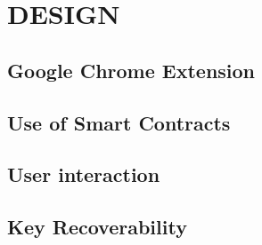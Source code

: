 \chapter{DESIGN}

\section{Google Chrome Extension}
\section{Use of Smart Contracts}
\section{User interaction}
\section{Key Recoverability}
